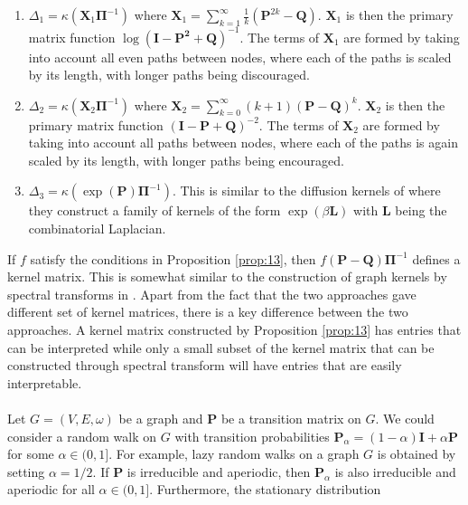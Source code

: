 \begin{enumerate}
\item $\Delta_1 = \kappa(\mathbf{X}_1\bm{\Pi}^{-1})$ where
  $\mathbf{X}_1 = \sum_{k=1}^{\infty}{\tfrac{1}{k}(\mathbf{P}^{2k} -
    \mathbf{Q})}$. $\mathbf{X}_1$ is then the primary matrix function
  $\log{(\mathbf{I} - \mathbf{P^2} + \mathbf{Q})^{-1}}$. The terms of
  $\mathbf{X}_1$ are formed by taking into account all even paths
  between nodes, where each of the paths is scaled by its length, with
  longer paths being discouraged.
\item $\Delta_{2} = \kappa(\mathbf{X}_2\bm{\Pi}^{-1})$ where
  $\mathbf{X}_2 = \sum_{k=0}^{\infty}{(k+1)(\mathbf{P} -
    \mathbf{Q})^{k}}$. $\mathbf{X}_2$ is then the primary matrix function
  $(\mathbf{I} - \mathbf{P} + \mathbf{Q})^{-2}$. The terms of
  $\mathbf{X}_2$ are formed by taking into account all paths
  between nodes, where each of the paths is again scaled by its
  length, with longer paths being encouraged.
\item $\Delta_{3} = \kappa(\exp(\mathbf{P})\bm{\Pi}^{-1})$. This is
  similar to the diffusion kernels of \citet{kondor02:_diffus} where
  they construct a family of kernels of the form $\exp(\beta
  \mathbf{L})$ with $\mathbf{L}$ being the combinatorial Laplacian.
\end{enumerate}
%
%
If $f$ satisfy the conditions in Proposition \ref{prop:13}, then
$f(\mathbf{P} - \mathbf{Q})\bm{\Pi}^{-1}$ defines a kernel
matrix. This is somewhat similar to the construction of graph kernels
by spectral transforms in
\citet{zhu05:_semi,chapelle03:_clust_kernel_semi_super_learn,smola03:_kernel}.
Apart from the fact that the two approaches gave different set of
kernel matrices, there is a key difference between the two
approaches. A kernel matrix constructed by Proposition \ref{prop:13}
has entries that can be interpreted while only a small subset of the
kernel matrix that can be constructed through spectral transform will
have entries that are easily interpretable. \\ \\
\noindent
Let $G = (V,E,\omega)$ be a graph and $\mathbf{P}$ be a transition
matrix on $G$. We could consider a random walk on $G$ with transition
probabilities $\mathbf{P}_{\alpha} = (1 - \alpha)\mathbf{I} +
\alpha \mathbf{P}$ for some $\alpha \in (0,1]$. For example, lazy
random walks on a graph $G$ is obtained by setting $\alpha = 1/2$. If
$\mathbf{P}$ is irreducible and aperiodic, then
$\mathbf{P}_{\alpha}$ is also irreducible and aperiodic for
all $\alpha \in (0,1]$. Furthermore, the stationary distribution
